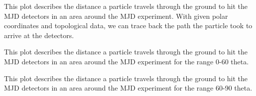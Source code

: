 \documentclass[a4paper,12pt]{article}
\begin{document}
This plot describes the distance a particle travels through the ground to hit the MJD detectors in an area around the MJD experiment. With given polar coordinates and topological data, we can trace back the path the particle took to arrive at the detectors. 

\begin{figure}[H]
\centering
{}%
\end{figure}

This plot describes the distance a particle travels through the ground to hit the MJD detectors in an area around the MJD experiment for the range 0-60 theta.

\begin{figure}[H]
\centering
{}%
\end{figure}

This plot describes the distance a particle travels through the ground to hit the MJD detectors in an area around the MJD experiment for the range 60-90 theta.
\end{document}
